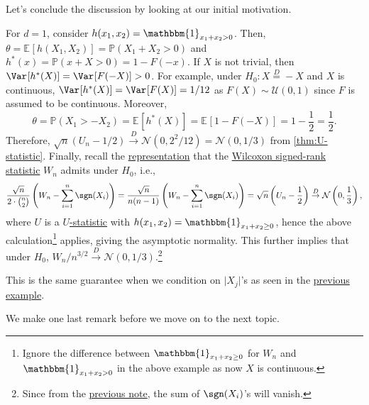 Let's conclude the discussion by looking at our initial motivation.

\begin{eg}\label{eg:Wilcoxon-signed-rank-statistic-asymptotic-normality}
	For \(d = 1\), consider \(h(x_1, x_2) = \mathbbm{1}_{x_1 + x_2 > 0} \). Then, \(\theta = \mathbb{E}_{}[h(X_1, X_2)] = \mathbb{P} (X_1 + X_2 > 0)\) and \(h^{\ast} (x) = \mathbb{P} (x + X > 0) = 1 - F(-x)\). If \(X\) is not trivial, then \(\Var_{}[h^{\ast} (X)] = \Var_{}[F(-X)] > 0\). For example, under \(H_0 \colon X \overset{D}{=} -X \) and \(X\) is continuous, \(\Var_{}[h^{\ast} (X)] = \Var_{}[F(X)] = 1 / 12\) as \(F(X) \sim \mathcal{U} (0, 1)\) since \(F\) is assumed to be continuous. Moreover,
	\[
		\theta
		= \mathbb{P} (X_1 > -X_2)
		= \mathbb{E}_{}[h^{\ast} (X)]
		= \mathbb{E}_{}[1 - F(-X)]
		= 1 - \frac{1}{2}
		= \frac{1}{2}.
	\]
	Therefore, \(\sqrt{n} ( U_n - 1 / 2 ) \overset{D}{\to} \mathcal{N} ( 0, 2^2 / 12 ) = \mathcal{N} ( 0, 1 / 3 ) \) from \autoref{thm:U-statistic}. Finally, recall the \hyperref[eq:Wilcoxon-signed-rank-test]{representation} that the \hyperref[def:Wilcoxon-signed-rank-statistic]{Wilcoxon signed-rank statistic} \(W_n\) admits under \(H_0\), i.e.,
	\[
		\frac{\sqrt{n}}{2 \cdot \binom{n}{2}}  \left( W_n - \sum_{i=1}^{n} \sgn (X_i) \right)
		= \frac{\sqrt{n}}{n(n-1)} \left( W_n - \sum_{i=1}^{n} \sgn (X_i) \right)
		= \sqrt{n} \left( U_n - \frac{1}{2} \right)
		\overset{D}{\to} \mathcal{N} \left( 0, \frac{1}{3} \right),
	\]
	where \(U\) is a \hyperref[def:U-statistic]{\(U\)-statistic} with \(h(x_1, x_2) = \mathbbm{1}_{x_1 + x_2 \geq 0} \), hence the above calculation\footnote{Ignore the difference between \(\mathbbm{1}_{x_1 + x_2 \geq 0} \) for \(W_n\) and \(\mathbbm{1}_{x_1 + x_2 > 0} \) in the above example as now \(X\) is continuous.} applies, giving the asymptotic normality. This further implies that under \(H_0\), \(W_n / n^{3 / 2} \overset{D}{\to} \mathcal{N} (0, 1 / 3)\).\footnote{Since from the \hyperref[not:Wilcoxon-signed-rank-test-alone]{previous note}, the sum of \(\sgn (X_i)\)'s will vanish.}
\end{eg}

\begin{note}
	This is the same guarantee when we condition on \(\lvert X_j \rvert \)'s as seen in the \hyperref[eg:Wilcoxon-signed-rank-statistic-two-sample-probelm]{previous example}.
\end{note}

We make one last remark before we move on to the next topic.

